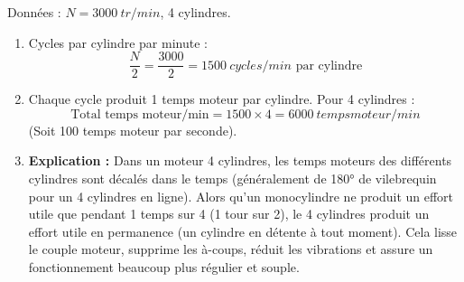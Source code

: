\documentclass[11pt]{article}
\begin{document}
\begin{corrige}
Données : $N = \SI{3000}{tr/min}$, 4 cylindres.
\begin{enumerate}
\item Cycles par cylindre par minute :
      \[
      \frac{N}{2} = \frac{3000}{2} = \SI{1500}{cycles/min \text{ par cylindre}}
      \]
\item Chaque cycle produit 1 temps moteur par cylindre. Pour 4 cylindres :
      \[
      \text{Total temps moteur/min} = 1500 \times 4 = \SI{6000}{temps moteur/min}
      \]
      (Soit 100 temps moteur par seconde).
\item \textbf{Explication :} Dans un moteur 4 cylindres, les temps moteurs des différents cylindres sont décalés dans le temps (généralement de 180° de vilebrequin pour un 4 cylindres en ligne). Alors qu'un monocylindre ne produit un effort utile que pendant 1 temps sur 4 (1 tour sur 2), le 4 cylindres produit un effort utile en permanence (un cylindre en détente à tout moment). Cela lisse le couple moteur, supprime les à-coups, réduit les vibrations et assure un fonctionnement beaucoup plus régulier et souple.
\end{enumerate}
\end{corrige}
\end{document}
